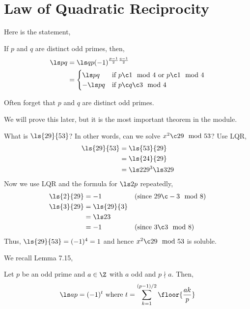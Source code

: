 
\section{Law of Quadratic Reciprocity}
Here is the statement,
\begin{nthm}[LQR]
  If $p$ and $q$ are distinct odd primes, then,
  \begin{align*}
    \ls p q &= \ls q p (-1)^{\frac{p-1}{2}\frac{q-1}{2}}\\
    &= \begin{cases}
      \ls p q & \text{if } p \c 1 \mod 4 \text{ or } p \c 1 \mod 4\\
      -\ls p q & \text{if } p \c q \c 3 \mod 4
  \end{cases}
  \end{align*}
\end{nthm}

\begin{remark}
   Often forget that $p$ and $q$ are distinct odd primes.
\end{remark}

\noindent
We will prove this later, but it is the most important theorem in the module.

\begin{eg}
  What is $\ls{29}{53}$? In other words, can we solve $x^2 \c 29 \mod 53$? Use LQR,
  \begin{align*}
    \ls{29}{53} &= \ls{53}{29} \\
    &= \ls{24}{29}\\
    &= \ls 2 {29} ^3 \ls 3 {29}
  \end{align*}
  Now we use LQR and the formula for $\ls 2 p$ repeatedly,
  \begin{align*}
    \ls{2}{29} &= -1 && (\text{since $29 \c -3 \mod 8$})\\
    \ls{3}{29} &= \ls{29}{3} \\
    &= \ls 2 3\\
    &= -1 && (\text{since $3 \c 3 \mod 8$})
  \end{align*}
  Thus, $\ls{29}{53} = (-1)^4 = 1$ and hence $x^2 \c 29 \mod 53$ is soluble.
\end{eg}

We recall Lemma 7.15,
\begin{nlemma}[Lemma 7.15]
  Let $p$ be an odd prime and $a \in \Z$ with $a$ odd and $p \nmid a$. Then,
  $$ \ls a p = (-1)^t \text{ where } t = \sum_{k=1}^{(p-1)/2} \floor{\frac{ak}{p}}$$
\end{nlemma}

